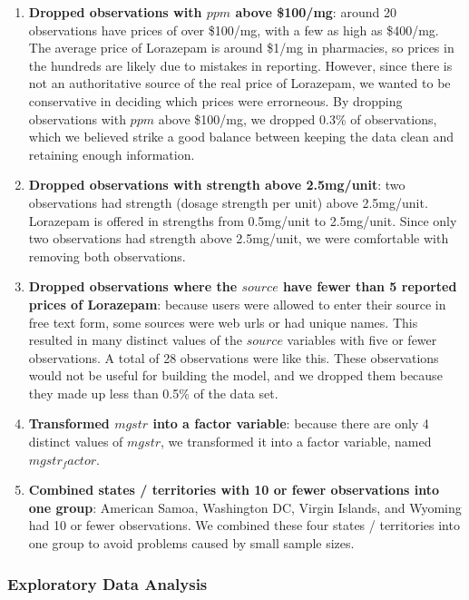 \documentclass[
]{article}
\providecommand{\tightlist}{%
  \setlength{\itemsep}{0pt}\setlength{\parskip}{0pt}}
\begin{document}
\begin{enumerate}
\def\labelenumi{\arabic{enumi}.}
\tightlist
\item
  \textbf{Dropped observations with \(ppm\) above \$100/mg}: around 20
  observations have prices of over \$100/mg, with a few as high as
  \$400/mg. The average price of Lorazepam is around \$1/mg in
  pharmacies, so prices in the hundreds are likely due to mistakes in
  reporting. However, since there is not an authoritative source of the
  real price of Lorazepam, we wanted to be conservative in deciding
  which prices were errorneous. By dropping observations with \(ppm\)
  above \$100/mg, we dropped 0.3\% of observations, which we believed
  strike a good balance between keeping the data clean and retaining
  enough information.
\item
  \textbf{Dropped observations with strength above 2.5mg/unit}: two
  observations had strength (dosage strength per unit) above 2.5mg/unit.
  Lorazepam is offered in strengths from 0.5mg/unit to 2.5mg/unit. Since
  only two observations had strength above 2.5mg/unit, we were
  comfortable with removing both observations.
\item
  \textbf{Dropped observations where the \(source\) have fewer than 5
  reported prices of Lorazepam}: because users were allowed to enter
  their source in free text form, some sources were web urls or had
  unique names. This resulted in many distinct values of the \(source\)
  variables with five or fewer observations. A total of 28 observations
  were like this. These observations would not be useful for building
  the model, and we dropped them because they made up less than 0.5\% of
  the data set.
\item
  \textbf{Transformed \(mgstr\) into a factor variable}: because there
  are only 4 distinct values of \(mgstr\), we transformed it into a
  factor variable, named \(mgstr_factor\).
\item
  \textbf{Combined states / territories with 10 or fewer observations
  into one group}: American Samoa, Washington DC, Virgin Islands, and
  Wyoming had 10 or fewer observations. We combined these four states /
  territories into one group to avoid problems caused by small sample
  sizes.
\end{enumerate}

\hypertarget{exploratory-data-analysis}{%
\subsubsection{Exploratory Data
Analysis}\label{exploratory-data-analysis}}
\end{document}
